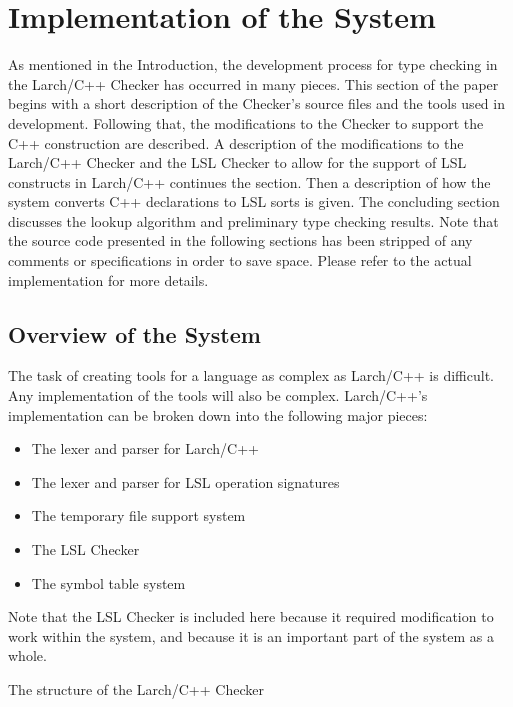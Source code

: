 \section{Implementation of the System} 
As mentioned in the
Introduction, the development process for type checking in the
Larch/C++ Checker has occurred in many pieces. This section of the
paper begins with a short description of the Checker's source files
and the tools used in development. Following that, the modifications to
the Checker to support the C++  construction are
described. A description of the modifications to the Larch/C++ Checker
and the LSL Checker to allow for the support of LSL constructs in
Larch/C++ continues the section. Then a description of how
the system converts C++ declarations to LSL sorts is given. The
concluding section discusses the lookup algorithm and preliminary type
checking results. Note that the source code presented in the following
sections has been stripped of any comments or specifications in order to save
space. Please refer to the actual implementation for more details.

\subsection{Overview of the System}
The task of creating tools for a language as complex as Larch/C++ is
difficult. Any implementation of the tools will also be complex.
Larch/C++'s implementation can be broken down into the following major pieces:
\begin{itemize}

\item The lexer and parser for Larch/C++
\item The lexer and parser for LSL operation signatures
\item The temporary file support system
\item The LSL Checker
\item The symbol table system

\end{itemize}

\noindent Note that the LSL Checker is included here because it required
modification to work within the system, and because it is an important 
part of the system as a whole.
 
\begin{BFIGURE}
\begin{center}

\end{center}
\caption{The structure of the Larch/C++ Checker}
\label{sysover2}
\end{BFIGURE}

